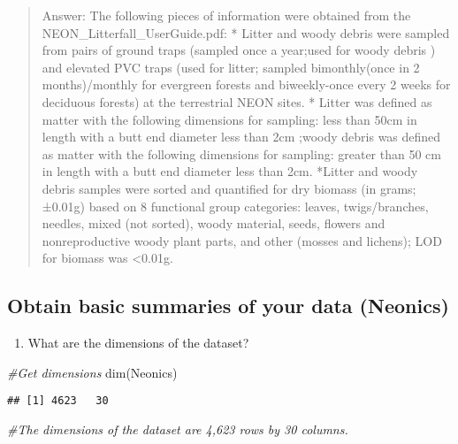 \documentclass[
]{article}
\newenvironment{Shaded}{\begin{snugshade}}{\end{snugshade}}
\newcommand{\CommentTok}[1]{\textcolor[rgb]{0.56,0.35,0.01}{\textit{#1}}}
\newcommand{\FunctionTok}[1]{\textcolor[rgb]{0.00,0.00,0.00}{#1}}
\newcommand{\NormalTok}[1]{#1}
\providecommand{\tightlist}{%
  \setlength{\itemsep}{0pt}\setlength{\parskip}{0pt}}
\begin{document}
\begin{quote}
Answer: The following pieces of information were obtained from the
NEON\_Litterfall\_UserGuide.pdf: * Litter and woody debris were sampled
from pairs of ground traps (sampled once a year;used for woody debris )
and elevated PVC traps (used for litter; sampled bimonthly(once in 2
months)/monthly for evergreen forests and biweekly-once every 2 weeks
for deciduous forests) at the terrestrial NEON sites. * Litter was
defined as matter with the following dimensions for sampling: less than
50cm in length with a butt end diameter less than 2cm ;woody debris was
defined as matter with the following dimensions for sampling: greater
than 50 cm in length with a butt end diameter less than 2cm. *Litter and
woody debris samples were sorted and quantified for dry biomass (in
grams; ±0.01g) based on 8 functional group categories: leaves,
twigs/branches, needles, mixed (not sorted), woody material, seeds,
flowers and nonreproductive woody plant parts, and other (mosses and
lichens); LOD for biomass was \textless0.01g.
\end{quote}

\hypertarget{obtain-basic-summaries-of-your-data-neonics}{%
\subsection{Obtain basic summaries of your data
(Neonics)}\label{obtain-basic-summaries-of-your-data-neonics}}

\begin{enumerate}
\def\labelenumi{\arabic{enumi}.}
\setcounter{enumi}{4}
\tightlist
\item
  What are the dimensions of the dataset?
\end{enumerate}

\begin{Shaded}
\begin{Highlighting}[]
\CommentTok{\#Get dimensions }
\FunctionTok{dim}\NormalTok{(Neonics) }
\end{Highlighting}
\end{Shaded}

\begin{verbatim}
## [1] 4623   30
\end{verbatim}

\begin{Shaded}
\begin{Highlighting}[]
\CommentTok{\#The dimensions of the dataset are 4,623 rows by 30 columns.    }
\end{Highlighting}
\end{Shaded}
\end{document}
